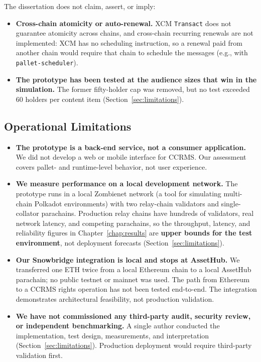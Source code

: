 The dissertation does not claim, assert, or imply:

\begin{itemize}

\item \textbf{Cross-chain atomicity or auto-renewal.} XCM \texttt{Transact} does not guarantee atomicity across chains, and cross-chain recurring renewals are not implemented: XCM has no scheduling instruction, so a renewal paid from another chain would require that chain to schedule the messages (e.g., with \texttt{pallet-scheduler}).

\item \textbf{The prototype has been tested at the audience sizes that win in the simulation.} The former fifty-holder cap was removed, but no test exceeded 60 holders per content item (Section~\ref{sec:limitations}).

\end{itemize}

\subsection{Operational Limitations}\label{subsec:operational-limitations}

\begin{itemize}

\item \textbf{The prototype is a back-end service, not a consumer application.} We did not develop a web or mobile interface for CCRMS. Our assessment covers pallet- and runtime-level behavior, not user experience.

\item \textbf{We measure performance on a local development network.} The prototype runs in a local Zombienet network (a tool for simulating multi-chain Polkadot environments) with two relay-chain validators and single-collator parachains. Production relay chains have hundreds of validators, real network latency, and competing parachains, so the throughput, latency, and reliability figures in Chapter~\ref{chap:results} are \textbf{upper bounds for the test environment}, not deployment forecasts (Section~\ref{sec:limitations}).

\item \textbf{Our Snowbridge integration is local and stops at AssetHub.} We transferred one ETH twice from a local Ethereum chain to a local AssetHub parachain; no public testnet or mainnet was used. The path from Ethereum to a CCRMS rights operation has not been tested end-to-end. The integration demonstrates architectural feasibility, not production validation.

\item \textbf{We have not commissioned any third-party audit, security review, or independent benchmarking.} A single author conducted the implementation, test design, measurements, and interpretation (Section~\ref{sec:limitations}). Production deployment would require third-party validation first.

\end{itemize}
